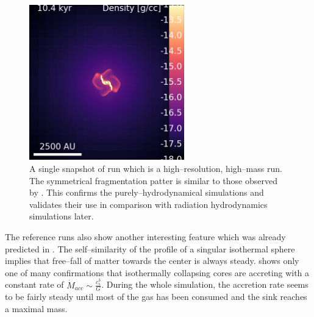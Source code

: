 \begin{figure}[!htb]
 \centering
 \includegraphics[width=0.6\textwidth]{Figures/isotropic_binaries}
 \captionsetup{justification=justified,singlelinecheck=false,width=\linewidth}
 \decoRule
 \caption[Fragmentation pattern]{A single snapshot of run  which is a high--resolution, high--mass run.
                                 The symmetrical fragmentation patter is similar to those observed by \citet{Commercon_binaries}.
                                 This confirms the purely--hydrodynamical simulations and validates their use in comparison with radiation hydrodynamics simulations later.}
\label{fig:isotropic_binaries}
\end{figure}
\FloatBarrier

The reference runs also show another interesting feature which was already predicted in .
The self--similarity of the profile of a singular isothermal sphere implies that free--fall of matter towards the center is always steady.
 shows only one of many confirmations that isothermally collapsing cores are accreting with a constant rate of $\dot{M}_{acc} \sim \frac{c_{s}^{3}}{G}$.
During the whole simulation, the accretion rate seems to be fairly steady until most of the gas has been consumed and the sink reaches a maximal mass.

